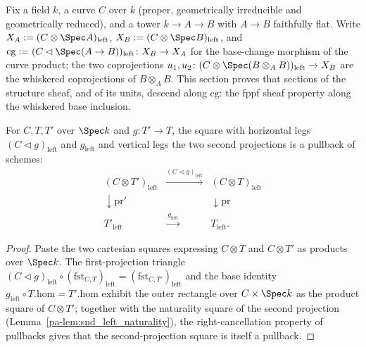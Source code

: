 Fix a field \(k\), a curve \(C\) over \(k\) (proper, geometrically irreducible and geometrically
reduced), and a tower \(k \to A \to B\) with \(A \to B\) faithfully flat. Write \(X_A := (C
\otimes \Spec A)_{\mathrm{left}}\), \(X_B := (C \otimes \Spec B)_{\mathrm{left}}\), and
\(\mathrm{cg} := (C \lhd \Spec(A \to B))_{\mathrm{left}} \colon X_B \to X_A\) for the base-change
morphism of the curve product; the two coprojections \(u_1, u_2 \colon (C \otimes \Spec(B
\otimes_A B))_{\mathrm{left}} \to X_B\) are the whiskered coprojections of \(B \otimes_A B\).
This section proves that sections of the structure sheaf, and of its units, descend along
\(\mathrm{cg}\): the fppf sheaf property along the whiskered base inclusion.

\begin{theorem}
  \label{pa-thm:isPullback_whiskerLeft_snd}
  \leanok

  For \(C, T, T'\) over \(\Spec k\) and \(g \colon T' \to T\), the square with horizontal legs
  \((C \lhd g)_{\mathrm{left}}\) and \(g_{\mathrm{left}}\) and vertical legs the two second
  projections is a pullback of schemes:
  \[
    \begin{array}{ccc}
      (C \otimes T')_{\mathrm{left}} & \xrightarrow{(C \lhd g)_{\mathrm{left}}} &
        (C \otimes T)_{\mathrm{left}} \\
      \downarrow \mathrm{pr}' & & \downarrow \mathrm{pr} \\
      T'_{\mathrm{left}} & \xrightarrow{\ g_{\mathrm{left}}\ } & T_{\mathrm{left}}.
    \end{array}
  \]
\end{theorem}
\begin{proof}
  \leanok
  Paste the two cartesian squares expressing \(C \otimes T\) and \(C \otimes T'\) as products
  over \(\Spec k\).  The first-projection triangle \((C \lhd g)_{\mathrm{left}} \circ
  (\mathrm{fst}_{C,T})_{\mathrm{left}} = (\mathrm{fst}_{C,T'})_{\mathrm{left}}\) and the base
  identity \(g_{\mathrm{left}} \circ T.\mathrm{hom} = T'.\mathrm{hom}\) exhibit the outer
  rectangle over \(C \times \Spec k\) as the product square of \(C \otimes T'\); together with
  the naturality square of the second projection (Lemma~\ref{pa-lem:snd_left_naturality}), the
  right-cancellation property of pullbacks gives that the second-projection square is itself a
  pullback.
\end{proof}

